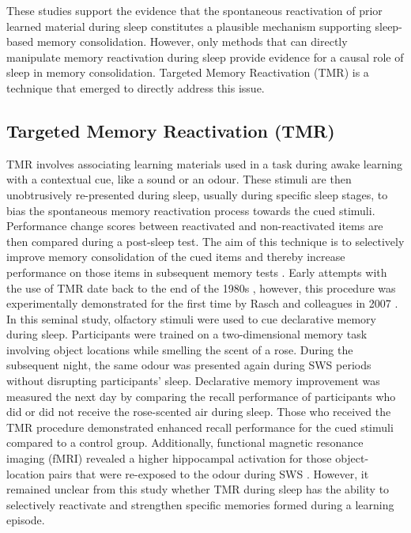 These studies support the evidence that the spontaneous reactivation of prior learned material during sleep constitutes a plausible mechanism supporting sleep-based memory consolidation. However, only methods that can directly manipulate memory reactivation during sleep provide evidence for a causal role of sleep in memory consolidation. Targeted Memory Reactivation (TMR) is a technique that emerged to directly address this issue.




\subsection{Targeted Memory Reactivation (TMR)}
TMR involves associating learning materials used in a task during awake learning with a contextual cue, like a sound or an odour. These stimuli are then unobtrusively re-presented during sleep, usually during specific sleep stages, to bias the spontaneous memory reactivation process towards the cued stimuli.  Performance change scores between reactivated and non-reactivated items are then compared during a post-sleep test. The aim of this technique is to selectively improve memory consolidation of the cued items and thereby increase performance on those items in subsequent memory tests \parencite{andrillon_sleep_2011,hu_promoting_2020,rasch_odor_2007}.
Early attempts with the use of TMR date back to the end of the 1980s \parencite{oudiette_upgrading_2013}, however, this procedure was experimentally demonstrated for the first time by Rasch and colleagues in 2007 \parencite{rasch_odor_2007}. In this seminal study, olfactory stimuli were used to cue declarative memory during sleep. Participants were trained on a two-dimensional memory task involving object locations while smelling the scent of a rose. During the subsequent night, the same odour was presented again during SWS periods without disrupting participants’ sleep. Declarative memory improvement was measured the next day by comparing the recall performance of participants who did or did not receive the rose-scented air during sleep. Those who received the TMR procedure demonstrated enhanced recall performance for the cued stimuli compared to a control group. Additionally, functional magnetic resonance imaging (fMRI) revealed a higher hippocampal activation for those object-location pairs that were re-exposed to the odour during SWS \parencite{oudiette_upgrading_2013,rasch_odor_2007}. However, it remained unclear from this study whether TMR during sleep has the ability to selectively reactivate and strengthen specific memories formed during a learning episode. \\
